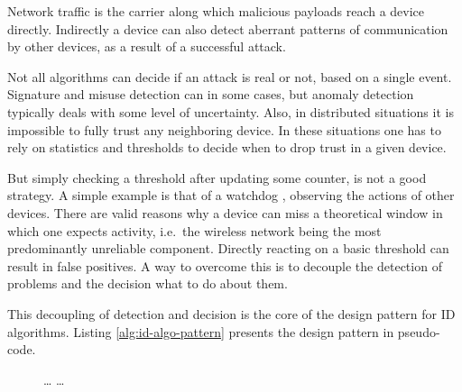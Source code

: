 \documentclass[conference]{IEEEtran}
\begin{document}
Network traffic is the carrier along which malicious payloads reach a device
directly. Indirectly a device can also detect aberrant patterns of
communication by other devices, as a result of a successful attack.

Not all algorithms can decide if an attack is real or not, based on a single
event. Signature and misuse detection can in some cases, but anomaly detection
typically deals with some level of uncertainty. Also, in distributed situations
it is impossible to fully trust any neighboring device. In these situations one
has to rely on statistics and thresholds to decide when to drop trust in a
given device.

But simply checking a threshold after updating some counter, is not a good
strategy. A simple example is that of a watchdog \cite{mishra2004intrusion},
observing the actions of other devices. There are valid reasons why a device
can miss a theoretical window in which one expects activity, i.e.\ the wireless
network being the most predominantly unreliable component. Directly reacting on
a basic threshold can result in false positives. A way to overcome this is to
decouple the detection of problems and the decision what to do about them.

This decoupling of detection and decision is the core of the design pattern for
ID algorithms. Listing \ref{alg:id-algo-pattern} presents the design pattern in
pseudo-code.

\begin{figure}[ht]
\begin{algorithmic}[1]
     \label{alg:id-algo-pattern-loop1}
     \State \dots {}
    \EndFor
      
    \State {}  \label{alg:id-algo-pattern-send1}
  \EndFunction
  \State
     \label{alg:id-algo-pattern-loop2} \label{alg:id-algo-pattern-common-data}
       
        \State \dots {}
        \State {}  \label{alg:id-algo-pattern-send2}
      \EndIf
    \EndFor
  \EndFunction
  \State
\end{algorithmic}
\end{figure}
\end{document}
